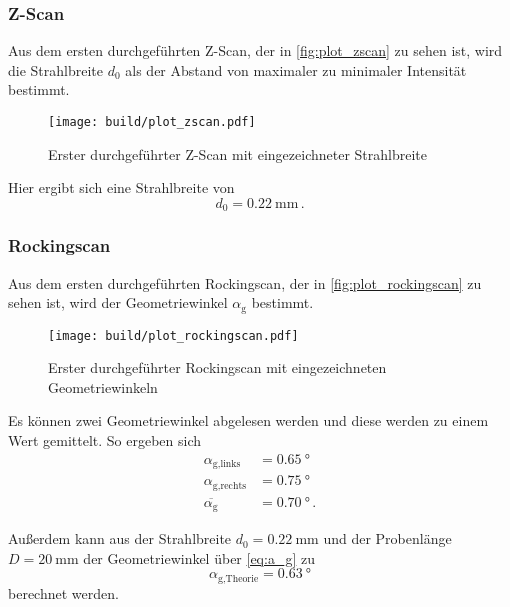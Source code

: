 \subsubsection{Z-Scan}
\label{sssec:Z-Scan}

Aus dem ersten durchgeführten Z-Scan, der in \autoref{fig:plot_zscan} zu sehen ist,
wird die Strahlbreite $d_0$ als der Abstand von maximaler zu minimaler Intensität bestimmt.

\begin{figure}
    \centering
    \texttt{[image: build/plot\_zscan.pdf]}
    \caption{Erster durchgeführter Z-Scan mit eingezeichneter Strahlbreite}
    \label{fig:plot_zscan}
\end{figure}

Hier ergibt sich eine Strahlbreite von
\begin{equation*}
    d_0 = \SI{0.22}{\milli\meter} \, .
\end{equation*}

\subsubsection{Rockingscan}
\label{sssec:Rockingscan}

Aus dem ersten durchgeführten Rockingscan, der in \autoref{fig:plot_rockingscan} zu sehen ist,
wird der Geometriewinkel $\alpha_\text{g}$ bestimmt.

\begin{figure}
    \centering
    \texttt{[image: build/plot\_rockingscan.pdf]}
    \caption{Erster durchgeführter Rockingscan mit eingezeichneten Geometriewinkeln}
    \label{fig:plot_rockingscan}
\end{figure}

Es können zwei Geometriewinkel abgelesen werden und diese werden zu einem Wert gemittelt.
So ergeben sich
\begin{align*}
    \alpha_\text{g,links} &= \SI{0.65}{\degree} \\
    \alpha_\text{g,rechts} &= \SI{0.75}{\degree} \\
    \overline{\alpha_\text{g}} &= \SI{0.70}{\degree} \, .
\end{align*}

Außerdem kann aus der Strahlbreite $d_0 = \SI{0.22}{\milli\meter}$ und der Probenlänge $D = \SI{20}{\milli\meter}$
der Geometriewinkel über \autoref{eq:a_g} zu
\begin{equation*}
    \alpha_\text{g,Theorie} = \SI{0.63}{\degree}
\end{equation*}
berechnet werden. 

